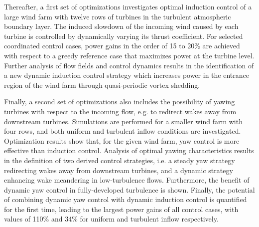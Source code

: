 Thereafter, a first set of optimizations investigates optimal induction control of a large wind farm with twelve rows of turbines in the turbulent atmospheric boundary layer. The induced slowdown of the incoming wind caused by each turbine is controlled by dynamically varying its thrust coefficient. For selected coordinated control cases, power gains in the order of 15 to 20\% are achieved with respect to a greedy reference case that maximizes power at the turbine level. Further analysis of flow fields and control dynamics results in the identification of a new dynamic induction control strategy which increases power in the entrance region of the wind farm through quasi-periodic vortex shedding. 

Finally, a second set of optimizations also includes the possibility of yawing turbines with respect to the incoming flow, e.g. to redirect wakes away from downstream turbines. Simulations are performed for a smaller wind farm with four rows, and both uniform and turbulent inflow conditions are investigated. Optimization results show that, for the given wind farm, yaw control is more effective than induction control. Analysis of optimal yawing characteristics results in the definition of two derived control strategies, i.e. a steady yaw strategy redirecting wakes away from downstream turbines, and a dynamic strategy enhancing wake meandering in low-turbulence flows. Furthermore, the benefit of dynamic yaw control in fully-developed turbulence is shown. Finally, the potential of combining dynamic yaw control with dynamic induction control is quantified for the first time, leading to the largest power gains of all control cases, with values of 110\% and 34\% for uniform and turbulent inflow respectively. 



\cleardoublepage

